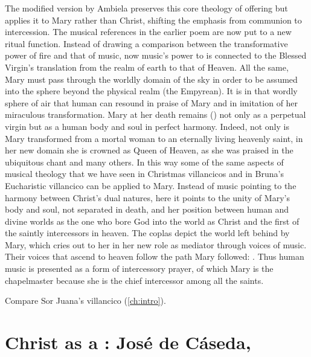 The modified version by Ambiela preserves this core theology of offering but
applies it to Mary rather than Christ, shifting the emphasis from communion to
intercession.
The musical references in the earlier poem are now put to a new ritual function.
Instead of drawing a comparison between the transformative power of fire and
that of music, now music's power to  is connected to
the Blessed Virgin's translation from the realm of earth to that of Heaven.
All the same, Mary must pass through the worldly domain of the sky in order to
be assumed into the sphere beyond the physical realm (the Empyrean).
It is in that wordly sphere of air that human  can
resound in praise of Mary and in imitation of her miraculous transformation.
Mary at her death remains  () not only as a
perpetual virgin but as a human body and soul in perfect harmony.  
Indeed, not only is Mary transformed from a mortal woman to an eternally living
heavenly saint, in her new domain she is crowned as Queen of Heaven, as she was
praised in the ubiquitous  chant and many others.
In this way some of the same aspects of musical theology that we have seen in
Christmas villancicos and in Bruna's Eucharistic villancico can be applied to
Mary.  
Instead of music pointing to the harmony between Christ's dual natures, here it
points to the unity of Mary's body and soul, not separated in death, and her
position between human and divine worlds as the one who bore God into the world
as Christ and the first of the saintly intercessors in heaven.
The coplas depict the world left behind by Mary, which cries out to her in her
new role as mediator through voices of music.
Their voices that ascend to heaven follow the path Mary followed: .
Thus human music is presented as a form of intercessory prayer, of which Mary
is the chapelmaster because she is the chief intercessor among all the saints.%
\begin{Footnote}
    Compare Sor Juana's villancico 
    (\cref{ch:intro}).
\end{Footnote}


\section{Christ as a : José de Cáseda, }

